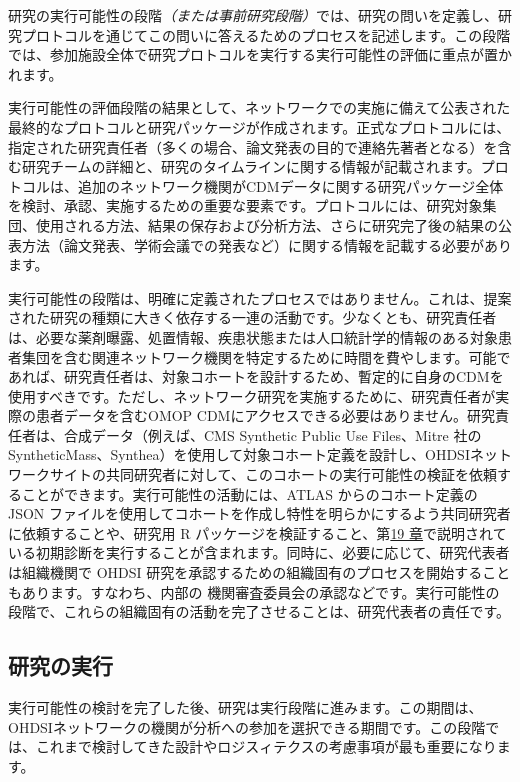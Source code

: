 \documentclass[
  11pt]{book}
\theoremstyle{definition}
\theoremstyle{definition}
\theoremstyle{definition}
\theoremstyle{definition}
\theoremstyle{remark}
\begin{document}
研究の実行可能性の段階\emph{（または事前研究段階）}では、研究の問いを定義し、研究プロトコルを通じてこの問いに答えるためのプロセスを記述します。この段階では、参加施設全体で研究プロトコルを実行する実行可能性の評価に重点が置かれます。

実行可能性の評価段階の結果として、ネットワークでの実施に備えて公表された最終的なプロトコルと研究パッケージが作成されます。正式なプロトコルには、指定された研究責任者（多くの場合、論文発表の目的で連絡先著者となる）を含む研究チームの詳細と、研究のタイムラインに関する情報が記載されます。プロトコルは、追加のネットワーク機関がCDMデータに関する研究パッケージ全体を検討、承認、実施するための重要な要素です。プロトコルには、研究対象集団、使用される方法、結果の保存および分析方法、さらに研究完了後の結果の公表方法（論文発表、学術会議での発表など）に関する情報を記載する必要があります。

実行可能性の段階は、明確に定義されたプロセスではありません。これは、提案された研究の種類に大きく依存する一連の活動です。少なくとも、研究責任者は、必要な薬剤曝露、処置情報、疾患状態または人口統計学的情報のある対象患者集団を含む関連ネットワーク機関を特定するために時間を費やします。可能であれば、研究責任者は、対象コホートを設計するため、暫定的に自身のCDMを使用すべきです。ただし、ネットワーク研究を実施するために、研究責任者が実際の患者データを含むOMOP CDMにアクセスできる必要はありません。研究責任者は、合成データ（例えば、CMS Synthetic Public Use Files、Mitre 社のSyntheticMass、Synthea）を使用して対象コホート定義を設計し、OHDSIネットワークサイトの共同研究者に対して、このコホートの実行可能性の検証を依頼することができます。実行可能性の活動には、ATLAS からのコホート定義の JSON ファイルを使用してコホートを作成し特性を明らかにするよう共同研究者に依頼することや、研究用 R パッケージを検証すること、第\href{https://ohdsi.github.io/TheBookOfOhdsi/StudySteps.html\#StudySteps}{19 章}で説明されている初期診断を実行することが含まれます。同時に、必要に応じて、研究代表者は組織機関で OHDSI 研究を承認するための組織固有のプロセスを開始することもあります。すなわち、内部の 機関審査委員会の承認などです。実行可能性の段階で、これらの組織固有の活動を完了させることは、研究代表者の責任です。

\subsection{研究の実行}\label{ux7814ux7a76ux306eux5b9fux884c-1}

実行可能性の検討を完了した後、研究は実行段階に進みます。この期間は、OHDSIネットワークの機関が分析への参加を選択できる期間です。この段階では、これまで検討してきた設計やロジスィテクスの考慮事項が最も重要になります。
\end{document}

